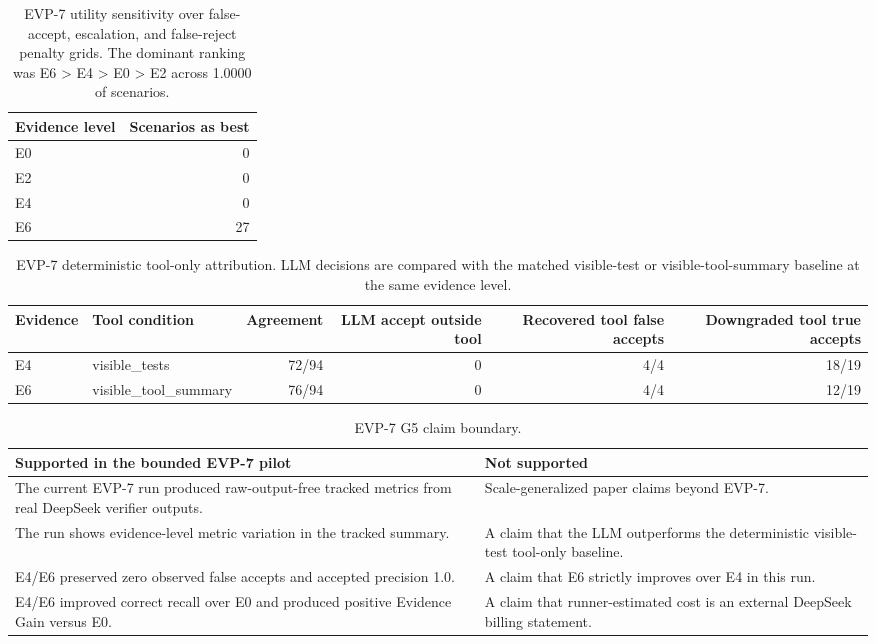 \documentclass[conference]{IEEEtran}
\begin{document}
\begin{table}[t]
\centering
\caption{EVP-7 utility sensitivity over false-accept, escalation, and false-reject penalty grids. The dominant ranking was E6 > E4 > E0 > E2 across 1.0000 of scenarios.}
\label{tab:evp7-utility-sensitivity}
\begin{tabular}{lr}
\toprule
Evidence level & Scenarios as best \\
\midrule
E0 & 0 \\
E2 & 0 \\
E4 & 0 \\
E6 & 27 \\
\bottomrule
\end{tabular}
\end{table}


\begin{table}[t]
\centering
\caption{EVP-7 deterministic tool-only attribution. LLM decisions are compared with the matched visible-test or visible-tool-summary baseline at the same evidence level.}
\label{tab:evp7-tool-attribution}
\begin{tabular}{llrrrr}
\toprule
Evidence & Tool condition & Agreement & LLM accept outside tool & Recovered tool false accepts & Downgraded tool true accepts \\
\midrule
E4 & visible\_tests & 72/94 & 0 & 4/4 & 18/19 \\
E6 & visible\_tool\_summary & 76/94 & 0 & 4/4 & 12/19 \\
\bottomrule
\end{tabular}
\end{table}


\begin{table}[t]
\centering
\caption{EVP-7 G5 claim boundary.}
\label{tab:evp7-claim-boundary}
\begin{tabular}{p{}p{}}
\toprule
Supported in the bounded EVP-7 pilot & Not supported \\
\midrule
The current EVP-7 run produced raw-output-free tracked metrics from real DeepSeek verifier outputs. & Scale-generalized paper claims beyond EVP-7. \\
The run shows evidence-level metric variation in the tracked summary. & A claim that the LLM outperforms the deterministic visible-test tool-only baseline. \\
E4/E6 preserved zero observed false accepts and accepted precision 1.0. & A claim that E6 strictly improves over E4 in this run. \\
E4/E6 improved correct recall over E0 and produced positive Evidence Gain versus E0. & A claim that runner-estimated cost is an external DeepSeek billing statement. \\
\bottomrule
\end{tabular}
\end{table}
\end{document}
